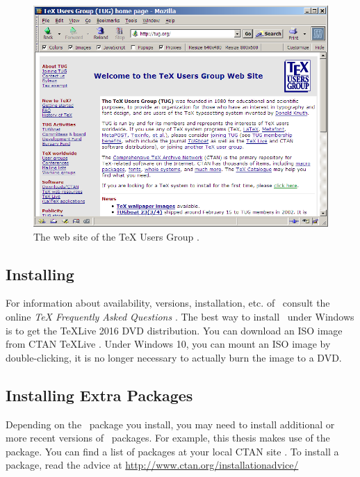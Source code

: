 \begin{figure}[tp]
\centering
\includegraphics[keepaspectratio,width=\hsize,height=\halfh]
{images/tugorg.png}

\caption[TeX Users Group web site]{
The web site of the TeX Users Group \citep{TUG}.
}
\label{fig:TUG}
\end{figure}




\subsection{Installing \protect\LaTeXe}

For information about availability, versions, installation, etc. of
\LaTeXe\ consult the online
\emph{TeX Frequently Asked Questions} \citep{TeXfaq}.
%
The best way to install \LaTeXe\ under Windows is to get the TeXLive
2016 \citep{texlive} DVD distribution. You can download an ISO image
from CTAN TeXLive \citep{ctan-texlive}.  Under Windows 10, you can
mount an ISO image by double-clicking, it is no longer necessary to
actually burn the image to a DVD.





\subsection{Installing Extra \protect\LaTeXe Packages}

Depending on the \LaTeXe\ package you install, you may need to install
additional or more recent versions of \LaTeXe\ packages. For example,
this thesis makes use of the \LaTeXe\  package.
%
You can find a list of packages at your local CTAN site \citep{CTAN}.
To install a package, read the advice at
\url{http://www.ctan.org/installationadvice/}





